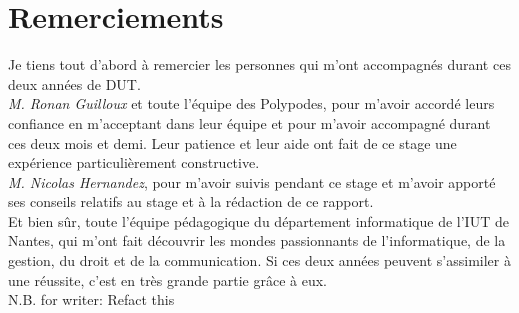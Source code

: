 \section*{Remerciements}

Je tiens tout d'abord à remercier les personnes qui m'ont accompagnés durant ces deux années de DUT.\\

\textit{M. Ronan Guilloux} et toute l'équipe des Polypodes, pour m'avoir accordé leurs confiance en m'acceptant dans leur équipe et pour m'avoir accompagné durant ces deux mois et demi. Leur patience et leur aide ont fait de ce stage une expérience particulièrement constructive.\\

\textit{M. Nicolas Hernandez}, pour m'avoir suivis pendant ce stage et m'avoir apporté ses conseils relatifs au stage et à la rédaction de ce rapport.\\

Et bien sûr, toute l'équipe pédagogique du département informatique de l'IUT de Nantes, qui m'ont fait découvrir les mondes passionnants de l'informatique, de la gestion, du droit et de la communication. Si ces deux années peuvent s'assimiler à une réussite, c'est en très grande partie grâce à eux.\\

N.B. for writer: Refact this
